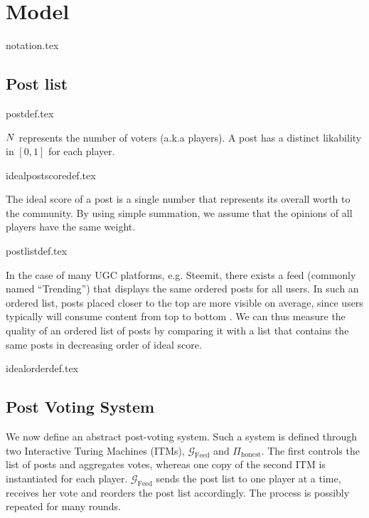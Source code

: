 \section{Model}
  {notation.tex}

  \subsection{Post list}
    {postdef.tex}

    \noindent $N$ represents the number of voters (a.k.a players). A
    post has a distinct likability in $\left[0, 1\right]$ for each player.

    {idealpostscoredef.tex}

    \noindent The ideal score of a post is a single number that represents its
    overall worth to the community. By using simple summation, we assume that
    the opinions of all players have the same weight.

    {postlistdef.tex}

    \noindent In the case of many UGC platforms, e.g. Steemit, there exists a
    feed (commonly named ``Trending'') that displays the same ordered posts for
    all users. In such an ordered list, posts placed closer to the top are more
    visible on average, since users typically will consume content from top to bottom
    . We can thus measure the quality of an
    ordered list of posts by comparing it with a list that contains the same
    posts in decreasing order of ideal score.

    {idealorderdef.tex}

  \subsection{Post Voting System}
    We now define an abstract post-voting system. Such a system is defined
    through two Interactive Turing Machines (ITMs),
    $\mathcal{G}_{\mathrm{Feed}}$ and $\Pi_{\mathrm{honest}}$. The first
    controls the list of posts and aggregates votes, whereas one copy of the
    second ITM is instantiated for each player. $\mathcal{G}_{\mathrm{Feed}}$
    sends the post list to one player at a time, receives her vote and reorders
    the post list accordingly. The process is possibly repeated for many rounds.

